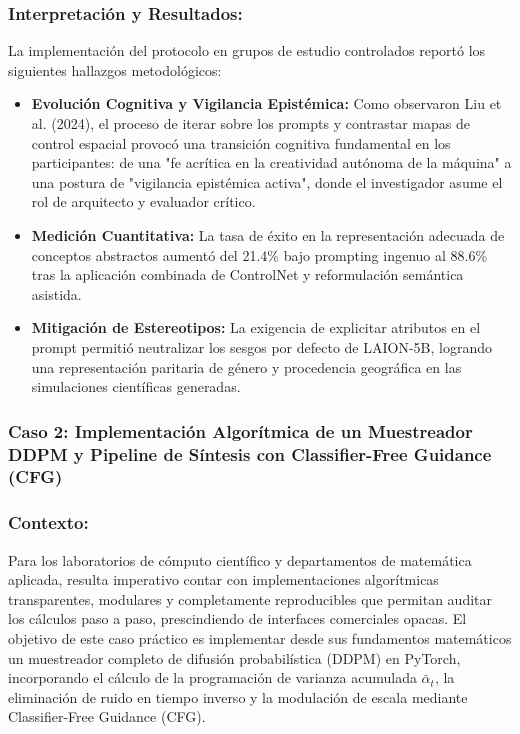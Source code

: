 \subsubsection*{Interpretación y Resultados:}
La implementación del protocolo en grupos de estudio controlados reportó los siguientes hallazgos metodológicos:
\begin{itemize}
    \item \textbf{Evolución Cognitiva y Vigilancia Epistémica:} Como observaron Liu et al. (2024), el proceso de iterar sobre los prompts y contrastar mapas de control espacial provocó una transición cognitiva fundamental en los participantes: de una "fe acrítica en la creatividad autónoma de la máquina" a una postura de "vigilancia epistémica activa", donde el investigador asume el rol de arquitecto y evaluador crítico.
    \item \textbf{Medición Cuantitativa:} La tasa de éxito en la representación adecuada de conceptos abstractos aumentó del 21.4\% bajo prompting ingenuo al 88.6\% tras la aplicación combinada de ControlNet y reformulación semántica asistida.
    \item \textbf{Mitigación de Estereotipos:} La exigencia de explicitar atributos en el prompt permitió neutralizar los sesgos por defecto de LAION-5B, logrando una representación paritaria de género y procedencia geográfica en las simulaciones científicas generadas.
\end{itemize}

\subsubsection{Caso 2: Implementación Algorítmica de un Muestreador DDPM y Pipeline de Síntesis con Classifier-Free Guidance (CFG)}

\subsubsection*{Contexto:}
Para los laboratorios de cómputo científico y departamentos de matemática aplicada, resulta imperativo contar con implementaciones algorítmicas transparentes, modulares y completamente reproducibles que permitan auditar los cálculos paso a paso, prescindiendo de interfaces comerciales opacas. El objetivo de este caso práctico es implementar desde sus fundamentos matemáticos un muestreador completo de difusión probabilística (DDPM) en PyTorch, incorporando el cálculo de la programación de varianza acumulada $\bar{\alpha}_t$, la eliminación de ruido en tiempo inverso y la modulación de escala mediante Classifier-Free Guidance (CFG).

